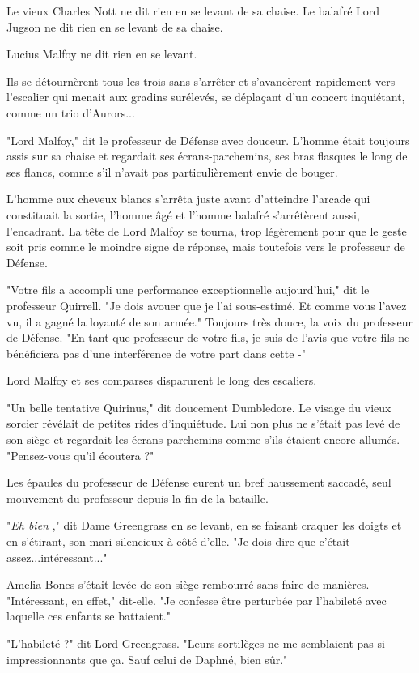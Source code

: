Le vieux Charles Nott ne dit rien en se levant de sa chaise. Le balafré Lord Jugson ne dit rien en se levant de sa chaise.

Lucius Malfoy ne dit rien en se levant.

Ils se détournèrent tous les trois sans s'arrêter et s'avancèrent rapidement vers l'escalier qui menait aux gradins surélevés, se déplaçant d'un concert inquiétant, comme un trio d'Aurors...

"Lord Malfoy," dit le professeur de Défense avec douceur. L'homme était toujours assis sur sa chaise et regardait ses écrans-parchemins, ses bras flasques le long de ses flancs, comme s'il n'avait pas particulièrement envie de bouger.

L'homme aux cheveux blancs s'arrêta juste avant d'atteindre l'arcade qui constituait la sortie, l'homme âgé et l'homme balafré s'arrêtèrent aussi, l'encadrant. La tête de Lord Malfoy se tourna, trop légèrement pour que le geste soit pris comme le moindre signe de réponse, mais toutefois vers le professeur de Défense.

"Votre fils a accompli une performance exceptionnelle aujourd'hui," dit le professeur Quirrell. "Je dois avouer que je l'ai sous-estimé. Et comme vous l'avez vu, il a gagné la loyauté de son armée." Toujours très douce, la voix du professeur de Défense. "En tant que professeur de votre fils, je suis de l'avis que votre fils ne bénéficiera pas d'une interférence de votre part dans cette -"

Lord Malfoy et ses comparses disparurent le long des escaliers.

"Un belle tentative Quirinus," dit doucement Dumbledore. Le visage du vieux sorcier révélait de petites rides d'inquiétude. Lui non plus ne s'était pas levé de son siège et regardait les écrans-parchemins comme s'ils étaient encore allumés. "Pensez-vous qu'il écoutera ?"

Les épaules du professeur de Défense eurent un bref haussement saccadé, seul mouvement du professeur depuis la fin de la bataille.

"\emph{Eh bien} ," dit Dame Greengrass en se levant, en se faisant craquer les doigts et en s'étirant, son mari silencieux à côté d'elle. "Je dois dire que c'était assez...intéressant..."

Amelia Bones s'était levée de son siège rembourré sans faire de manières. "Intéressant, en effet," dit-elle. "Je confesse être perturbée par l'habileté avec laquelle ces enfants se battaient."

"L'habileté ?" dit Lord Greengrass. "Leurs sortilèges ne me semblaient pas si impressionnants que ça. Sauf celui de Daphné, bien sûr."

